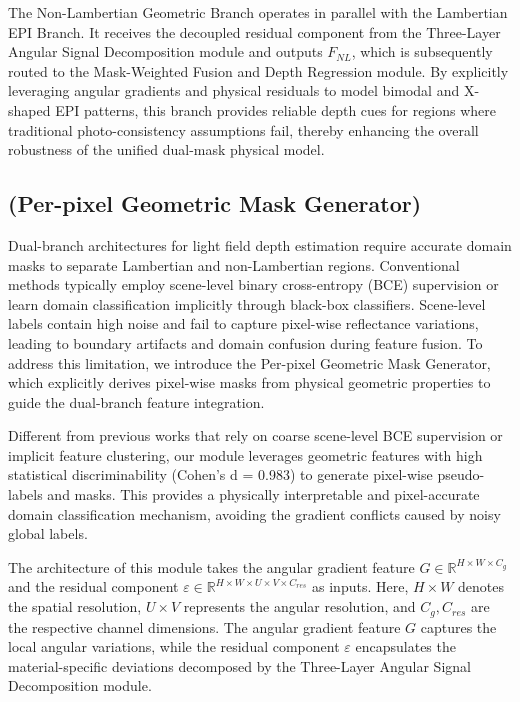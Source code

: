 The Non-Lambertian Geometric Branch operates in parallel with the Lambertian EPI Branch. It receives the decoupled residual component from the Three-Layer Angular Signal Decomposition module and outputs $F_{NL}$, which is subsequently routed to the Mask-Weighted Fusion and Depth Regression module. By explicitly leveraging angular gradients and physical residuals to model bimodal and X-shaped EPI patterns, this branch provides reliable depth cues for regions where traditional photo-consistency assumptions fail, thereby enhancing the overall robustness of the unified dual-mask physical model.

\subsection{(Per-pixel Geometric Mask Generator)}

Dual-branch architectures for light field depth estimation require accurate domain masks to separate Lambertian and non-Lambertian regions. Conventional methods typically employ scene-level binary cross-entropy (BCE) supervision or learn domain classification implicitly through black-box classifiers. Scene-level labels contain high noise and fail to capture pixel-wise reflectance variations, leading to boundary artifacts and domain confusion during feature fusion. To address this limitation, we introduce the Per-pixel Geometric Mask Generator, which explicitly derives pixel-wise masks from physical geometric properties to guide the dual-branch feature integration.

Different from previous works that rely on coarse scene-level BCE supervision or implicit feature clustering, our module leverages geometric features with high statistical discriminability (Cohen's d = 0.983) to generate pixel-wise pseudo-labels and masks. This provides a physically interpretable and pixel-accurate domain classification mechanism, avoiding the gradient conflicts caused by noisy global labels.

The architecture of this module takes the angular gradient feature $G \in \mathbb{R}^{H \times W \times C_g}$ and the residual component $\varepsilon \in \mathbb{R}^{H \times W \times U \times V \times C_{res}}$ as inputs. Here, $H \times W$ denotes the spatial resolution, $U \times V$ represents the angular resolution, and $C_g, C_{res}$ are the respective channel dimensions. The angular gradient feature $G$ captures the local angular variations, while the residual component $\varepsilon$ encapsulates the material-specific deviations decomposed by the Three-Layer Angular Signal Decomposition module.

